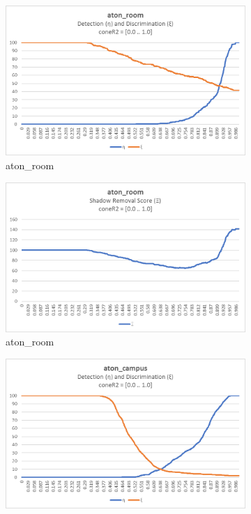 \begin{appendices}
\begin{figure}
  \begin{subfigure}{.45\linewidth}
  \includegraphics[width=1\linewidth]{figures/appendix/room_coneR2_response.jpg}
  \caption{aton\_room}
\end{subfigure}
\hfill
\begin{subfigure}{.45\linewidth}
  \includegraphics[width=1\linewidth]{figures/appendix/room_coneR2_score.jpg}
  \caption{aton\_room}
\end{subfigure}
\hfill
\begin{subfigure}{.45\linewidth}
  \includegraphics[width=1\linewidth]{figures/appendix/campus_coneR2_response.jpg}

\end{subfigure}
\end{figure}
\end{appendices}
